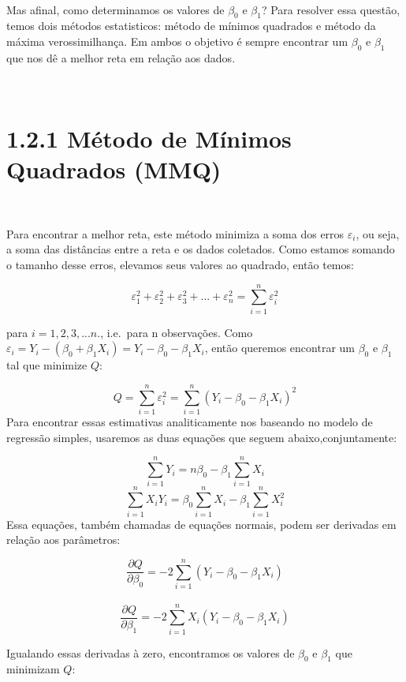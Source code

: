 \documentclass[
]{article}
\begin{document}
~

Mas afinal, como determinamos os valores de \(\beta_0\) e \(\beta_1\)?
Para resolver essa questão, temos dois métodos estatisticos: método de
mínimos quadrados e método da máxima verossimilhança. Em ambos o
objetivo é sempre encontrar um \(\beta_0\) e \(\beta_1\) que nos dê a
melhor reta em relação aos dados.

~

\hypertarget{muxe9todo-de-muxednimos-quadrados-mmq}{%
\section{1.2.1 Método de Mínimos Quadrados
(MMQ)}\label{muxe9todo-de-muxednimos-quadrados-mmq}}

~

Para encontrar a melhor reta, este método minimiza a soma dos erros
\(\varepsilon_i\), ou seja, a soma das distâncias entre a reta e os
dados coletados. Como estamos somando o tamanho desse erros, elevamos
seus valores ao quadrado, então temos:

\[\varepsilon_1^2+\varepsilon_2^2+\varepsilon_3^2+...+\varepsilon_n^2 = \sum_{i=1}^{n} \varepsilon_i^2\]

para \(i= 1,2,3,...n.\), i.e.~para n observações. Como
\(\varepsilon_i = Y_i-(\beta_0+\beta_1X_i)= Y_i-\beta_0-\beta_1X_i\),
então queremos encontrar um \(\beta_0\) e \(\beta_1\) tal que minimize
\(Q\):

\[Q=\sum_{i=1}^{n} \varepsilon_i^2=\sum_{i=1}^{n} (Y_i-\beta_0-\beta_1X_i)^2\]
Para encontrar essas estimativas analiticamente nos baseando no modelo
de regressão simples, usaremos as duas equações que seguem
abaixo,conjuntamente:

\[\sum_{i=1}^{n}Y_i = n\beta_0-\beta_1\sum_{i=1}^{n}X_i\]
\[\sum_{i=1}^{n}X_iY_i = \beta_0\sum_{i=1}^{n}X_i-\beta_1\sum_{i=1}^{n}X_i^2\]
Essa equações, também chamadas de equações normais, podem ser derivadas
em relação aos parâmetros:

\[\frac{\partial Q}{\partial \beta_0}=-2\sum_{i=1}^{n}(Y_i-\beta_0-\beta_1X_i)\]\\
\[\frac{\partial Q}{\partial \beta_1}=-2\sum_{i=1}^{n}X_i(Y_i-\beta_0-\beta_1X_i)\]

Igualando essas derivadas à zero, encontramos os valores de \(\beta_0\)
e \(\beta_1\) que minimizam \(Q\):

~
\end{document}
